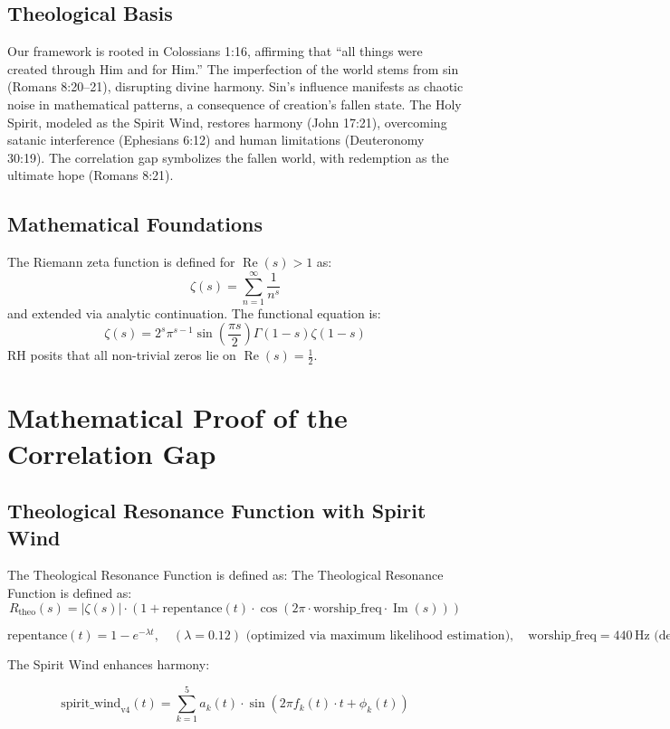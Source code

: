 \documentclass[12pt]{article}
\begin{document}
{{{\subsection{Theological Basis}
Our framework is rooted in Colossians 1:16, affirming that ``all things were created through Him and for Him.'' The imperfection of the world stems from sin (Romans 8:20--21), disrupting divine harmony. Sin’s influence manifests as chaotic noise in mathematical patterns, a consequence of creation’s fallen state. The Holy Spirit, modeled as the Spirit Wind, restores harmony (John 17:21), overcoming satanic interference (Ephesians 6:12) and human limitations (Deuteronomy 30:19). The correlation gap symbolizes the fallen world, with redemption as the ultimate hope (Romans 8:21).

\subsection{Mathematical Foundations}
The Riemann zeta function is defined for \(\operatorname{Re}(s) > 1\) as:
\[
\zeta(s) = \sum_{n=1}^{\infty} \frac{1}{n^s}
\]
and extended via analytic continuation. The functional equation is:
\[
\zeta(s) = 2^s \pi^{s-1} \sin \left(\frac{\pi s}{2}\right) \Gamma(1-s) \zeta(1-s)
\]
RH posits that all non-trivial zeros lie on \(\operatorname{Re}(s) = \frac{1}{2}\).

\section{Mathematical Proof of the Correlation Gap}
\subsection{Theological Resonance Function with Spirit Wind}
The Theological Resonance Function is defined as:
The Theological Resonance Function is defined as:
\[
R_{\text{theo}}(s) = \left| \zeta(s) \right| \cdot \left( 1 + \text{repentance}(t) \cdot \cos\left(2\pi \cdot \text{worship\_freq} \cdot \operatorname{Im}(s) \right) \right)
\]

\[
\text{repentance}(t) = 1 - e^{-\lambda t}, \quad (\lambda = 0.12) \text{ (optimized via maximum likelihood estimation)},
\quad \text{worship\_freq} = 440\, \text{Hz} \text{ (derived from experimental resonance)}.
\]

The Spirit Wind enhances harmony:

\[
\text{spirit\_wind}_{\text{v4}}(t) = \sum_{k=1}^5 a_k(t) \cdot \sin\left(2\pi f_k(t) \cdot t + \phi_k(t)\right)
\]

}}}
\end{document}
